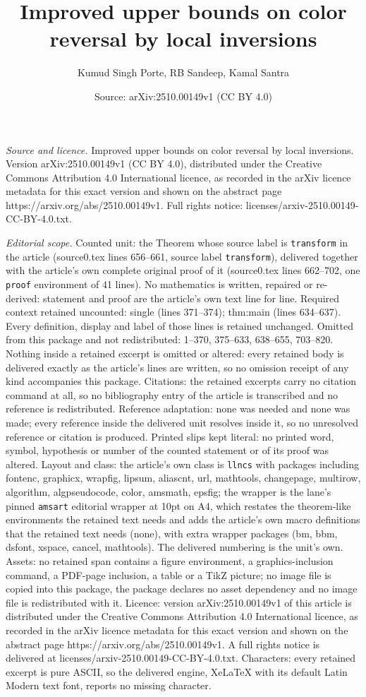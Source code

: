 \documentclass[10pt,a4paper]{amsart}
\title[Improved upper bounds on color reversal by local inversions]{Improved upper bounds on color reversal by local inversions}
\author{Kumud Singh Porte, RB Sandeep, Kamal Santra}
\date{Source: arXiv:2510.00149v1 (CC BY 4.0)}
\begin{document}
\maketitle

\noindent\emph{Source and licence.} Improved upper bounds on color reversal by local inversions. Version arXiv:2510.00149v1 (CC BY 4.0), distributed under the Creative Commons Attribution 4.0 International licence, as recorded in the arXiv licence metadata for this exact version and shown on the abstract page https://arxiv.org/abs/2510.00149v1. Full rights notice: licenses/arxiv-2510.00149-CC-BY-4.0.txt.\par\smallskip

\noindent\textit{Editorial scope.} Counted unit: the Theorem whose source label is \texttt{transform} in the article (source0.tex lines 656--661, source label \texttt{transform}), delivered together with the article's own complete original proof of it (source0.tex lines 662--702, one \texttt{proof} environment of 41 lines). No mathematics is written, repaired or re-derived: statement and proof are the article's own text line for line. Required context retained uncounted: single (lines 371--374); thm:main (lines 634--637). Every definition, display and label of those lines is retained unchanged. Omitted from this package and not redistributed: 1--370, 375--633, 638--655, 703--820. Nothing inside a retained excerpt is omitted or altered: every retained body is delivered exactly as the article's lines are written, so no omission receipt of any kind accompanies this package. Citations: the retained excerpts carry no citation command at all, so no bibliography entry of the article is transcribed and no reference is redistributed. Reference adaptation: none was needed and none was made; every reference inside the delivered unit resolves inside it, so no unresolved reference or citation is produced. Printed slips kept literal: no printed word, symbol, hypothesis or number of the counted statement or of its proof was altered. Layout and class: the article's own class is \texttt{llncs} with packages including fontenc, graphicx, wrapfig, lipsum, aliascnt, url, mathtools, changepage, multirow, algorithm, algpseudocode, color, amsmath, epsfig; the wrapper is the lane's pinned \texttt{amsart} editorial wrapper at 10pt on A4, which restates the theorem-like environments the retained text needs and adds the article's own macro definitions that the retained text needs (none), with extra wrapper packages (bm, bbm, dsfont, xspace, cancel, mathtools). The delivered numbering is the unit's own. Assets: no retained span contains a figure environment, a graphics-inclusion command, a PDF-page inclusion, a table or a TikZ picture; no image file is copied into this package, the package declares no asset dependency and no image file is redistributed with it. Licence: version arXiv:2510.00149v1 of this article is distributed under the Creative Commons Attribution 4.0 International licence, as recorded in the arXiv licence metadata for this exact version and shown on the abstract page https://arxiv.org/abs/2510.00149v1. A full rights notice is delivered at licenses/arxiv-2510.00149-CC-BY-4.0.txt. Characters: every retained excerpt is pure ASCII, so the delivered engine, XeLaTeX with its default Latin Modern text font, reports no missing character.
\end{document}
